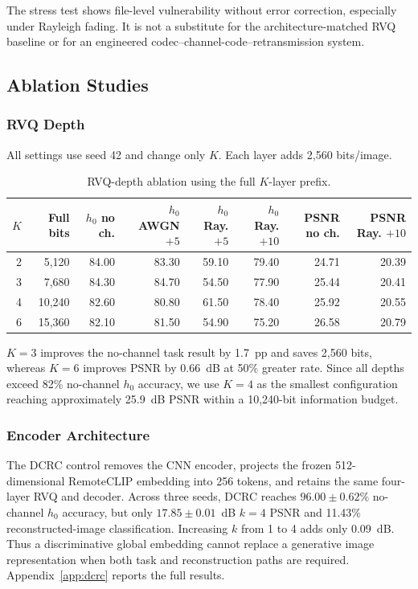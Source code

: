 \documentclass[letterpaper,journal]{IEEEtran}
\newcommand{\pp}{~pp\xspace}
\begin{document}
The stress test shows file-level vulnerability without error correction, especially under Rayleigh fading. It is not a substitute for the architecture-matched RVQ baseline or for an engineered codec--channel-code--retransmission system.

\subsection{Ablation Studies}

\subsubsection{RVQ Depth}
\label{sec:ablation-depth}
All settings use seed 42 and change only $K$. Each layer adds 2,560 bits/image.

\begin{table}[!t]
\centering
\caption{RVQ-depth ablation using the full $K$-layer prefix.}
\label{tab:depth}
\scriptsize
\begin{tabular}{@{}rrrrrrrr@{}}
\toprule
$K$ & Full bits & $h_0$ no ch. & $h_0$ AWGN $+5$ & $h_0$ Ray. $+5$ & $h_0$ Ray. $+10$ & PSNR no ch. & PSNR Ray. $+10$ \\ \midrule
2 & 5,120 & 84.00 & 83.30 & 59.10 & 79.40 & 24.71 & 20.39 \\
3 & 7,680 & 84.30 & 84.70 & 54.50 & 77.90 & 25.44 & 20.41 \\
4 & 10,240 & 82.60 & 80.80 & 61.50 & 78.40 & 25.92 & 20.55 \\
6 & 15,360 & 82.10 & 81.50 & 54.90 & 75.20 & 26.58 & 20.79 \\ \bottomrule
\end{tabular}
\end{table}

$K=3$ improves the no-channel task result by 1.7\pp and saves 2,560 bits, whereas $K=6$ improves PSNR by 0.66~dB at 50\% greater rate. Since all depths exceed 82\% no-channel $h_0$ accuracy, we use $K=4$ as the smallest configuration reaching approximately 25.9~dB PSNR within a 10,240-bit information budget.

\subsubsection{Encoder Architecture}
The DCRC control removes the CNN encoder, projects the frozen 512-dimensional RemoteCLIP embedding into 256 tokens, and retains the same four-layer RVQ and decoder. Across three seeds, DCRC reaches $96.00\pm0.62\%$ no-channel $h_0$ accuracy, but only $17.85\pm0.01$~dB $k=4$ PSNR and 11.43\% reconstructed-image classification. Increasing $k$ from 1 to 4 adds only 0.09~dB. Thus a discriminative global embedding cannot replace a generative image representation when both task and reconstruction paths are required. Appendix~\ref{app:dcrc} reports the full results.
\end{document}
